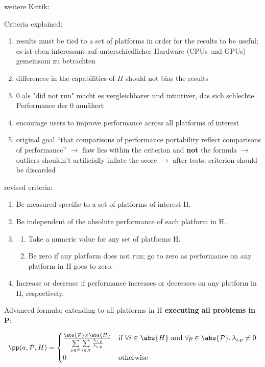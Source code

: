 \newpage
\cite{pennycook_revisiting_2021}

weitere Kritik: \cite{yokota_beginners_2018, bertoni_performance_2020, siklosi_heterogeneous_2018}

Criteria explained:
\begin{enumerate}
    \item results must be tied to a set of platforms in order for the results to be useful; es ist eben interessant \pp auf unterschiedlicher Hardware (CPUs und GPUs) gemeinsam zu betrachten
    \item differences in the capabilities of $H$ should not bias the results
    \item $0$ als "did not run" macht es vergleichbarer und intuitiver, das sich schlechte Performance der $0$ annähert
    \item encourage users to improve performance across all platforms of interest
    \item original goal \enquote{that comparisons of performance portability reflect comparisons of performance} $\rightarrow$ flaw lies within the criterion and \textbf{not} the formula $\rightarrow$ outliers shouldn't artificially inflate the \pp score $\rightarrow$ after tests, criterion should be discarded
\end{enumerate}

revised criteria:
\begin{enumerate}
    \item Be measured specific to a set of platforms of interest H.
    \item Be independent of the absolute performance of each platform in H.
    \item 
    \begin{enumerate}
        \item Take a numeric value for any set of platforms H.
        \item Be zero if any platform does not run; go to zero as performance on any platform in H goes to zero.
    \end{enumerate}
    \item Increase or decrease if performance increases or decreases on any platform in H, respectively.
\end{enumerate}

Advanced formula: extending \pp to all platforms in H \textbf{executing all problems in P}:

\[ \pp(a, \mathcal{P}, H) = 
        \begin{cases}
            \frac{\abs{\mathcal{P}}\times\abs{H}}{\sum\limits_{p \in \mathcal{P}}\sum\limits_{i \in H} \frac{\Lambda_{i, p}}{\lambda_{i, p}}} & \text{if }\forall i \in \abs{H}\text{ and }\forall p \in \abs{\mathcal{P}}, \lambda_{i, p} \neq 0 \\
            0                         & \text{otherwise}
        \end{cases} 
    \]

